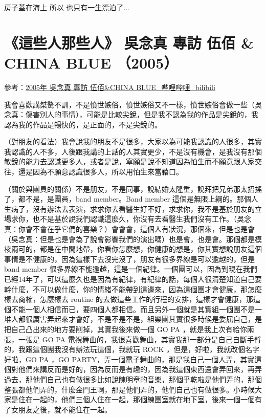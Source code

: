 \documentclass[UTF8,a4paper,oneside,twocolumn,12pt]{ctexbook}
\begin{document}
房子蓋在海上 所以 也只有一生漂泊了...

\section{《這些人那些人》 吳念真 專訪 伍佰 \& CHINA BLUE （2005）}
參考：\href{https://www.bilibili.com/video/BV1Jx411X79n}{2005年 吳念真 專訪 伍佰\&CHINA BLUE\_哔哩哔哩\_bilibili}

我會喜歡講桀驁不訓，不是憤世嫉俗，憤世嫉俗又不一樣，憤世嫉俗會做一些（吳念真：傷害別人的事情），可能是比較尖銳，但是我不認為我的作品是尖銳的，我認為我的作品是暢快的，是正面的，不是尖銳的。

（對朋友的看法）我會說我的朋友不是很多，大家以為可能我認識的人很多，其實我認識的人不多，人後跟我講的上話的人其實更少，不是沒有機會，是我沒有那個敏銳的能力去認識更多人，或者是說，寧願是說不知道因為怕生而不願意跟人家交往，還是因為不願意認識很多人，所以用怕生來當藉口。

（關於與團員的關係）不是朋友，不是同事，說結婚太隆重，說拜把兄弟那太招搖了，都不是，是團員，band member。Band member 這個是無限上綱的。那個人生病了，沒有辦法去表演，求求你去看醫生好不好，求求你，我不是基於朋友的立場求你，也不是基於說我們認識這麼久，你沒有去看醫生我們沒有工作。（吳念真：你會不會在乎它們的喜樂？）會會會，這個人有狀況，那個來，但是也是會（吳念真：但是也是會為了說會影響我們的演出嗎）也是會，也是會。那個都是模棱兩可的，都是在中間地帶，你看你怎麼想，你健康的想是，你其實想說朋友這個事情是不健康的，因為這樣下去沒完沒了，朋友有很多界線是可以逾越的，但是 band member 很多界線不能逾越，這是一個紀律。一個團可以，因為到現在我們已經14年了，可以這麼久也是因為有紀律，有紀律的話，每個人很清楚知道自己要幹什麼，不可以做什麼，你的情緒不能帶到這邊來，因為這個團才會健康，那怎麼樣去商榷，怎麼樣去 routine 的去做這些工作的行程的安排，這樣才會健康，那這個不能一個人相信而已，要四個人都相信。而且另外一個就是其實組一個團不是一堆人都很厲害弄起來才會好，不是不是不是，組樂團其實很多時候是委屈自己，是把自己凸出來的地方要削掉，其實我後來做一個 GO PA ，就是我上次有給你兩張，一張是 GO PA 電視舞曲的，我很喜歡舞曲，其實我那一部分是自己自斷手臂的，我跟這個團我沒有辦法玩這個，我就玩 ROCK ，但是，好啦，我就改個名字好啦，GO PA ，GO PARTY，弄一個電子舞曲的，那是我自己一個人弄，其實這個對他們來講反而是好的，因為反而是有趣的，因為我這個東西還會弄回來，再弄過去，那他們自己也有做很多比如說陳明章的音樂，那個乎乾啦是他們弄的，那個整張都他們弄的，什麼金門王啊，那是他們弄的，他們自己也有做很多。小時候大家是住在一起的，他們三個人住在一起，那個練團室就在地下室，後來一個一個有了女朋友之後，就不能住在一起。
\end{document}
